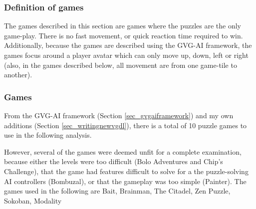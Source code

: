 \documentclass[a4paper,titlepage,final]{report}
\begin{document}
\subsubsection*{Definition of games}
The games described in this section are games where the puzzles are the only game-play. There is no fast movement, or quick reaction time required to win. Additionally, because the games are described using the GVG-AI framework, the games focus around a player avatar which can only move up, down, left or right (also, in the games described below, all movement are from one game-tile to another).

\subsubsection*{Games} 
From the GVG-AI framework (Section \ref{sec_gvgaiframework}) and my own additions (Section \ref{sec_writingnewvgdl}), there is a total of 10 puzzle games to use in the following analysis.

However, several of the games were deemed unfit for a complete examination, because either the levels were too difficult (Bolo Adventures and Chip's Challenge), that the game had features difficult to solve for a the puzzle-solving AI controllers (Bombuzal), or that the gameplay was too simple (Painter).
The games used in the following are Bait, Brainman, The Citadel, Zen Puzzle, Sokoban, Modality


\end{document}
